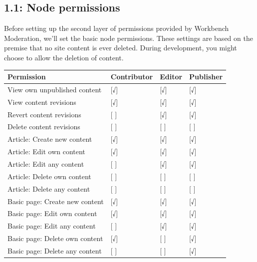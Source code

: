\documentclass[letterpaper,10pt,english]{sphinxmanual}
\begin{document}
\subsection{1.1: Node permissions}
\label{workbench:node-permissions}
Before setting up the second layer of permissions provided by Workbench Moderation, we'll set the basic node permissions. These settings are based on the premise that no site content is ever deleted. During development, you might choose to allow the deletion of content.

\begin{tabulary}{\linewidth}{|L|L|L|L|}
\hline
\textbf{
Permission
} & \textbf{
Contributor
} & \textbf{
Editor
} & \textbf{
Publisher
}\\\hline

View own unpublished content
 & 
{[}√{]}
 & 
{[}√{]}
 & 
{[}√{]}
\\\hline

View content revisions
 & 
{[}√{]}
 & 
{[}√{]}
 & 
{[}√{]}
\\\hline

Revert content revisions
 & 
{[} {]}
 & 
{[}√{]}
 & 
{[}√{]}
\\\hline

Delete content revisions
 & 
{[} {]}
 & 
{[} {]}
 & 
{[} {]}
\\\hline

Article: Create new content
 & 
{[}√{]}
 & 
{[}√{]}
 & 
{[}√{]}
\\\hline

Article: Edit own content
 & 
{[}√{]}
 & 
{[}√{]}
 & 
{[}√{]}
\\\hline

Article: Edit any content
 & 
{[} {]}
 & 
{[}√{]}
 & 
{[}√{]}
\\\hline

Article: Delete own content
 & 
{[} {]}
 & 
{[} {]}
 & 
{[} {]}
\\\hline

Article: Delete any content
 & 
{[} {]}
 & 
{[} {]}
 & 
{[} {]}
\\\hline

Basic page: Create new content
 & 
{[}√{]}
 & 
{[}√{]}
 & 
{[}√{]}
\\\hline

Basic page: Edit own content
 & 
{[}√{]}
 & 
{[}√{]}
 & 
{[}√{]}
\\\hline

Basic page: Edit any content
 & 
{[} {]}
 & 
{[}√{]}
 & 
{[}√{]}
\\\hline

Basic page: Delete own content
 & 
{[}√{]}
 & 
{[} {]}
 & 
{[}√{]}
\\\hline

Basic page: Delete any content
 & 
{[} {]}
 & 
{[} {]}
 & 
{[}√{]}
\\\hline
\end{tabulary}
\end{document}
